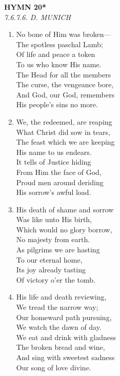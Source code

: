 \newpage
\begin{center}
    {\Large \textbf{HYMN 20*\textdagger{}}}
    \\
    \textit{7.6.7.6. D. MUNICH}
\end{center}
\vspace{1em}

\begin{enumerate}
    \item No bone of Him was broken--- \\
        The spotless paschal Lamb; \\
        Of life and peace a token \\
        To us who know His name. \\
        The Head for all the members \\
        The curse, the vengeance bore, \\
        And God, our God, remembers \\
        His people's sins no more.

    \item We, the redeemed, are reaping \\
        What Christ did sow in tears, \\
        The feast which we are keeping \\
        His name to us endears. \\
        It tells of Justice hiding \\
        From Him the face of God, \\
        Proud men around deriding \\
        His sorrow's awful load.

    \item His death of shame and sorrow \\
        Was like unto His birth, \\
        Which would no glory borrow, \\
        No majesty from earth. \\
        As pilgrims we are hasting \\
        To our eternal home, \\
        Its joy already tasting \\
        Of victory o'er the tomb.

    \item His life and death reviewing, \\
        We tread the narrow way; \\
        Our homeward path pursuing, \\
        We watch the dawn of day. \\
        We eat and drink with gladness \\
        The broken bread and wine, \\
        And sing with sweetest sadness \\
        Our song of love divine.

\end{enumerate}


